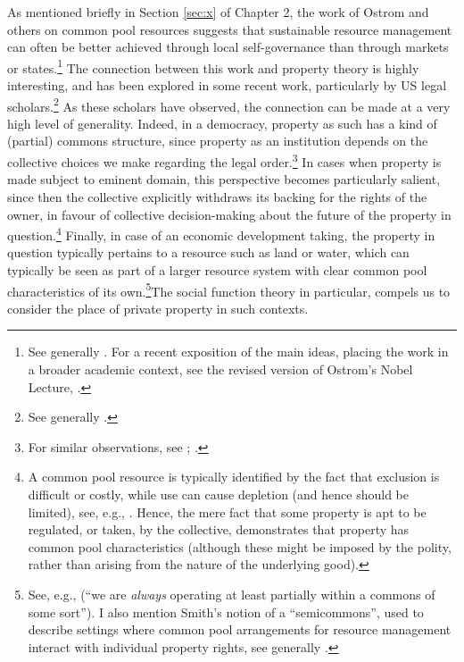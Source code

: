 As mentioned briefly in Section \ref{sec:x} of Chapter 2, the work of Ostrom and others on common pool resources suggests that sustainable resource management can often be better achieved through local self-governance than through markets or states.\footnote{See generally \cite{ostrom90}. For a recent exposition of the main ideas, placing the work in a broader academic context, see the revised version of Ostrom's Nobel Lecture, \cite{ostrom10}.} The connection between this work and property theory is highly interesting, and has been explored in some recent work, particularly by US legal scholars.\footnote{See generally \cite{rose11,fennel11}.} As these scholars have observed, the connection can be made at a very high level of generality. Indeed, in a democracy, property as such has a kind of (partial) commons structure, since property as an institution depends on the collective choices we make regarding the legal order.\footnote{For similar observations, see \cite[51]{rose90}; \cite[577]{heller00}.} In cases when property is made subject to eminent domain, this perspective becomes particularly salient, since then the collective explicitly withdraws its backing for the rights of the owner, in favour of collective decision-making about the future of the property in question.\footnote{A common pool resource is typically identified by the fact that exclusion is difficult or costly, while use can cause depletion (and hence should be limited), see, e.g., \cite[57]{ostrom10b}. Hence, the mere fact that some property is apt to be regulated, or taken, by the collective, demonstrates that property has common pool characteristics (although these might be imposed by the polity, rather than arising from the nature of the underlying good).} Finally, in case of an economic development taking, the property in question typically pertains to a resource such as land or water, which can typically be seen as part of a larger resource system with clear common pool characteristics of its own.\footnote{See, e.g., \cite[16]{fennel11} (``we are {\it always} operating at least partially within a commons of some sort''). I also mention Smith's notion of a ``semicommons'', used to describe settings where common pool arrangements for resource management interact with individual property rights, see generally \cite{smith00,smith02}.}The social function theory in particular, compels us to consider the place of private property in such contexts.

